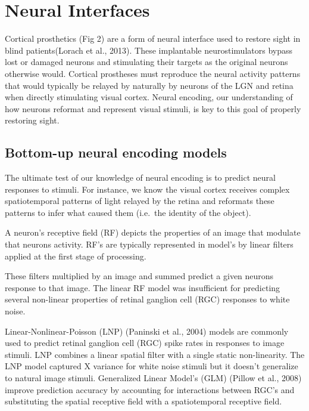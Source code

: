 \documentclass{templates/ucdenverthesis}
\begin{document}
\hypertarget{sec:neuralinterfaces}{%
\section{Neural Interfaces}\label{sec:neuralinterfaces}}

Cortical prosthetics (Fig 2) are a form of neural interface used to restore sight in blind patients(Lorach et al., 2013). These implantable neurostimulators bypass lost or damaged neurons and stimulating their targets as the original neurons otherwise would. Cortical prostheses must reproduce the neural activity patterns that would typically be relayed by naturally by neurons of the LGN and retina when directly stimulating visual cortex. Neural encoding, our understanding of how neurons reformat and represent visual stimuli, is key to this goal of properly restoring sight.

\hypertarget{bottom-up-neural-encoding-models}{%
\subsection{Bottom-up neural encoding models}\label{bottom-up-neural-encoding-models}}

The ultimate test of our knowledge of neural encoding is to predict neural responses to stimuli. For instance, we know the visual cortex receives complex spatiotemporal patterns of light relayed by the retina and reformats these patterns to infer what caused them (i.e.~the identity of the object).

A neuron's receptive field (RF) depicts the properties of an image that modulate that neurons activity. RF's are typically represented in model's by linear filters applied at the first stage of processing.

These filters multiplied by an image and summed predict a given neurons response to that image. The linear RF model was insufficient for predicting several non-linear properties of retinal ganglion cell (RGC) responses to white noise.

Linear-Nonlinear-Poisson (LNP) (Paninski et al., 2004) models are commonly used to predict retinal ganglion cell (RGC) spike rates in responses to image stimuli.
LNP combines a linear spatial filter with a single static non-linearity.
The LNP model captured X variance for white noise stimuli but it doesn't generalize to natural image stimuli.
Generalized Linear Model's (GLM) (Pillow et al., 2008) improve prediction accuracy by accounting for interactions between RGC's and substituting the spatial receptive field with a spatiotemporal receptive field.
\end{document}

